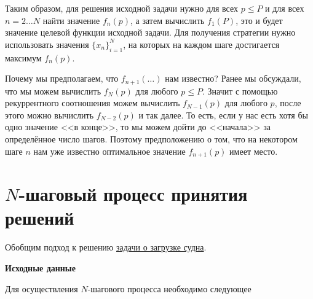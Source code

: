 Таким образом, для решения исходной задачи нужно для всех $p \le P$ и для всех $n = 2 \dots N$ найти значение $f_n(p)$, а затем вычислить $f_1(P)$, это и будет значение целевой функции исходной задачи. Для получения стратегии нужно использовать значения $\{x_n\}_{i=1}^N$, на которых на каждом шаге достигается максимум $f_n(p)$.

\begin{note}
	Почему мы предполагаем, что $f_{n+1}(\dots)$ нам известно? Ранее мы обсуждали, что мы можем вычислить $f_N(p)$ для любого $p \le P$. Значит с помощью рекуррентного соотношения можем вычислить $f_{N-1}(p)$ для любого $p$, после этого можно вычислить $f_{N-2}(p)$ и так далее. То есть, если у нас есть хотя бы одно значение <<в конце>>, то мы можем дойти до <<начала>> за определённое число шагов. Поэтому предположению о том, что на некотором шаге $n$ нам уже известно оптимальное значение $f_{n+1}(p)$ имеет место.
\end{note}

\section{$N$-шаговый процесс принятия решений}

Обобщим подход к решению \hyperref[pr:loading_vessel]{задачи о загрузке судна}.

\label{def:n_step_process}

\textbf{Исходные данные}

Для осуществления $N$-шагового процесса необходимо следующее

